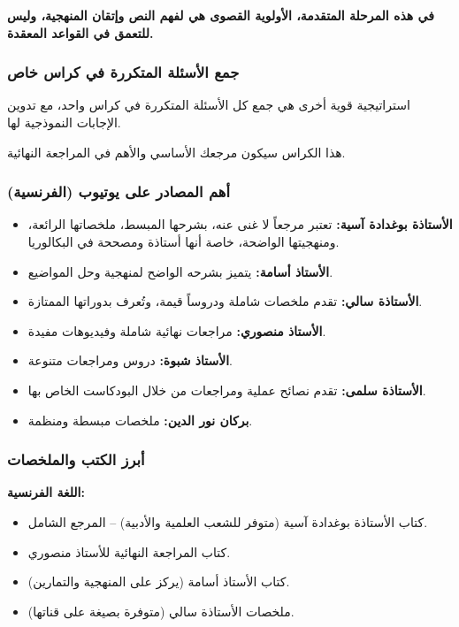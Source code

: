 \documentclass[12pt,a4paper]{book}
\newcommand{\importantAr}[1]{%
	\begin{important}
		\bfseries #1
	\end{important}
}
\begin{document}
	\importantAr{في هذه المرحلة المتقدمة، الأولوية القصوى هي لفهم النص وإتقان المنهجية، وليس للتعمق في القواعد المعقدة.}
	
	\subsubsection{جمع الأسئلة المتكررة في كراس خاص}
	
	استراتيجية قوية أخرى هي جمع كل الأسئلة المتكررة في كراس واحد، مع تدوين الإجابات النموذجية لها.
	
	هذا الكراس سيكون مرجعك الأساسي والأهم في المراجعة النهائية.
	
	\subsubsection{أهم المصادر على يوتيوب (الفرنسية)}
	
	\begin{itemize}
		\item \textbf{الأستاذة بوغدادة آسية:} تعتبر مرجعاً لا غنى عنه، بشرحها المبسط، ملخصاتها الرائعة، ومنهجيتها الواضحة، خاصة أنها أستاذة ومصححة في البكالوريا.
		\item \textbf{الأستاذ أسامة:} يتميز بشرحه الواضح لمنهجية  وحل المواضيع.
		\item \textbf{الأستاذة سالي:} تقدم ملخصات شاملة ودروساً قيمة، وتُعرف بدوراتها الممتازة.
		\item \textbf{الأستاذ منصوري:} مراجعات نهائية شاملة وفيديوهات مفيدة.
		\item \textbf{الأستاذ شبوة:} دروس ومراجعات متنوعة.
		\item \textbf{الأستاذة سلمى:} تقدم نصائح عملية ومراجعات من خلال البودكاست الخاص بها.
		\item \textbf{بركان نور الدين:} ملخصات مبسطة ومنظمة.
	\end{itemize}
	
	\subsubsection{أبرز الكتب والملخصات}
	
	\textbf{اللغة الفرنسية:}
	\begin{itemize}
		\item كتاب الأستاذة بوغدادة آسية (متوفر للشعب العلمية والأدبية) – المرجع الشامل.
		\item كتاب المراجعة النهائية للأستاذ منصوري.
		\item كتاب الأستاذ أسامة (يركز على المنهجية والتمارين).
		\item ملخصات الأستاذة سالي (متوفرة بصيغة  على قناتها).
	\end{itemize}
	
\end{document}
